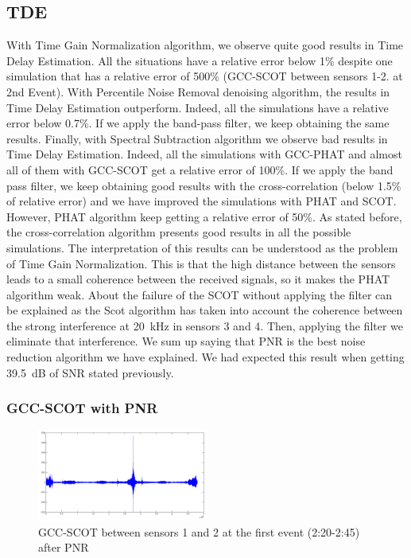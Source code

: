 \subsection{TDE}
  With Time Gain Normalization algorithm, we observe quite good results in Time Delay Estimation. All the situations have a relative error below 1\% despite one simulation that has a relative error of 500\% (GCC-SCOT between sensors 1-2. at 2nd Event).
  With Percentile Noise Removal denoising algorithm, the results in Time Delay Estimation outperform. Indeed, all the simulations have a relative error below 0.7\%. If we apply the band-pass filter, we keep obtaining the same results.
  Finally, with Spectral Subtraction algorithm we observe bad results in Time Delay Estimation. Indeed, all the simulations with GCC-PHAT and almost all of them with GCC-SCOT get a relative error of 100\%. If we apply the band pass filter, we keep obtaining good results with the cross-correlation (below 1.5\% of relative error) and we have improved the simulations with PHAT and SCOT. However, PHAT algorithm keep getting a relative error of 50\%.
  As stated before, the cross-correlation algorithm presents good results in all the possible simulations. The interpretation of this results can be understood as the problem of Time Gain Normalization. This is that the high distance between the sensors leads to a small coherence between the received signals, so it makes the PHAT algorithm weak. About the failure of the SCOT without applying the filter can be explained as the Scot algorithm has taken into account the coherence between the strong interference at \SI{20}{\kilo\Hz} in sensors 3 and 4. Then, applying the filter we eliminate that interference.
  We sum up saying that PNR is the best noise reduction algorithm we have explained. We had expected this result when getting \SI{39.5}{\dB} of SNR stated previously.
  
    \subsubsection{GCC-SCOT with PNR}

      \begin{figure}[htb]
	      \begin{center}
		      \includegraphics[width=0.5\textwidth]{figures/5gcc_Scot_PNR_12_1.png}
	      \end{center}
	      \caption{GCC-SCOT between sensors 1 and 2 at the first event (2:20-2:45) after PNR}
	      \label{fig:result_GCC_SCOT}
      \end{figure}
      
